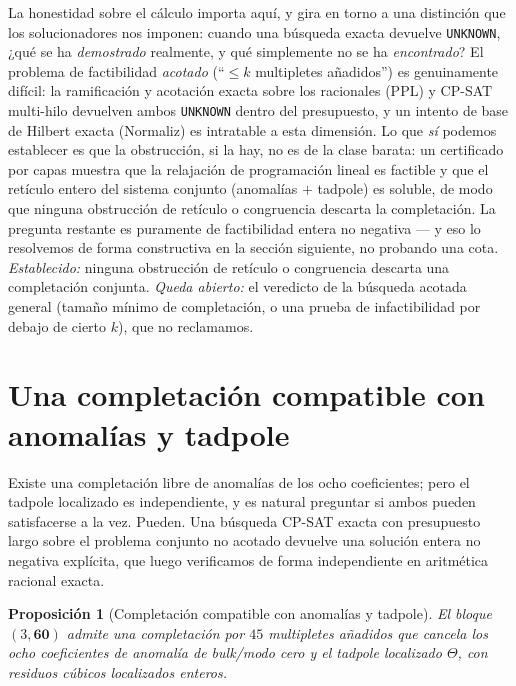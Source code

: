 \documentclass[11pt,a4paper]{article}
\newtheorem{proposition}{Proposici\'on}
\begin{document}
La honestidad sobre el c\'alculo importa aqu\'i, y gira en torno a una distinci\'on que los
solucionadores nos imponen: cuando una b\'usqueda exacta devuelve \texttt{UNKNOWN}, ¿qu\'e
se ha \emph{demostrado} realmente, y qu\'e simplemente no se ha \emph{encontrado}? El
problema de factibilidad \emph{acotado} (``$\le k$ multipletes a\~nadidos'') es
genuinamente dif\'icil: la ramificaci\'on y acotaci\'on exacta sobre los racionales (PPL) y
CP-SAT multi-hilo devuelven ambos \texttt{UNKNOWN} dentro del presupuesto, y un intento de
base de Hilbert exacta (Normaliz) es intratable a esta dimensi\'on. Lo que \emph{s\'i}
podemos establecer es que la obstrucci\'on, si la hay, no es de la clase barata: un
certificado por capas muestra que la relajaci\'on de programaci\'on lineal es factible y que
el ret\'iculo entero del sistema conjunto (anomal\'ias $+$ tadpole) es soluble, de modo que
ninguna obstrucci\'on de ret\'iculo o congruencia descarta la completaci\'on. La pregunta
restante es puramente de factibilidad entera no negativa --- y eso lo resolvemos de forma
constructiva en la secci\'on siguiente, no probando una cota. \emph{Establecido:} ninguna
obstrucci\'on de ret\'iculo o congruencia descarta una completaci\'on conjunta. \emph{Queda
abierto:} el veredicto de la b\'usqueda acotada general (tama\~no m\'inimo de completaci\'on,
o una prueba de infactibilidad por debajo de cierto $k$), que no reclamamos.

\section{Una completaci\'on compatible con anomal\'ias y tadpole}\label{sec:witness}
Existe una completaci\'on libre de anomal\'ias de los ocho coeficientes; pero el tadpole
localizado es independiente, y es natural preguntar si ambos pueden satisfacerse a la vez.
Pueden. Una b\'usqueda CP-SAT exacta con presupuesto largo sobre el problema conjunto no
acotado devuelve una soluci\'on entera no negativa expl\'icita, que luego verificamos de
forma independiente en aritm\'etica racional exacta.

\begin{proposition}[Completaci\'on compatible con anomal\'ias y tadpole]\label{prop:witness}
El bloque $(3,\mathbf{60})$ admite una completaci\'on por $45$ multipletes a\~nadidos que
cancela los ocho coeficientes de anomal\'ia de bulk/modo cero y el tadpole localizado
$\Theta$, con residuos c\'ubicos localizados enteros.
\end{proposition}
\end{document}
